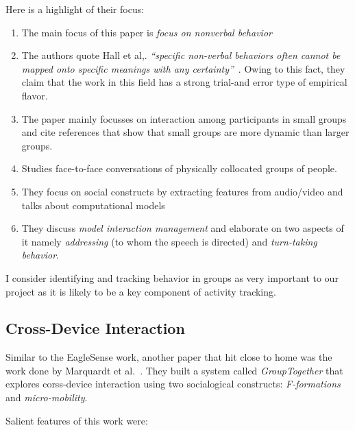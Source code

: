 Here is a highlight of their focus:

\begin{enumerate}
  \item The main focus of this paper is \emph{focus on nonverbal behavior}
  \item The authors quote Hall et al,. \emph{``specific non-verbal behaviors
    often cannot be mapped onto specific meanings with any
    certainty''}~\cite{Hall2015}. Owing to this fact, they claim that
    the work in this field has a strong trial-and error type of
    empirical flavor.
  \item The paper mainly focusses on interaction among participants in
    small groups and cite references that show that small groups are
    more dynamic than larger groups.
  \item Studies face-to-face conversations of physically collocated
    groups of people.
  \item They focus on social constructs by extracting features from
    audio/video and talks about computational models
  \item They discuss \emph{model interaction management} and elaborate
    on two aspects of it namely \emph{addressing} (to whom the speech
    is directed) and \emph{turn-taking behavior}.
\end{enumerate}

I consider identifying and tracking behavior in groups as very
important to our project as it is likely to be a key component of
activity tracking.


\subsection{Cross-Device Interaction}

Similar to the EagleSense work, another paper that hit close to home
was the work done by Marquardt et
al.~\cite{Marquardt:2012:CIV:2380116.2380121}. They built a system
called \emph{GroupTogether} that explores corss-device interaction
using two socialogical constructs: \emph{F-formations} and
\emph{micro-mobility}.

Salient features of this work were:


